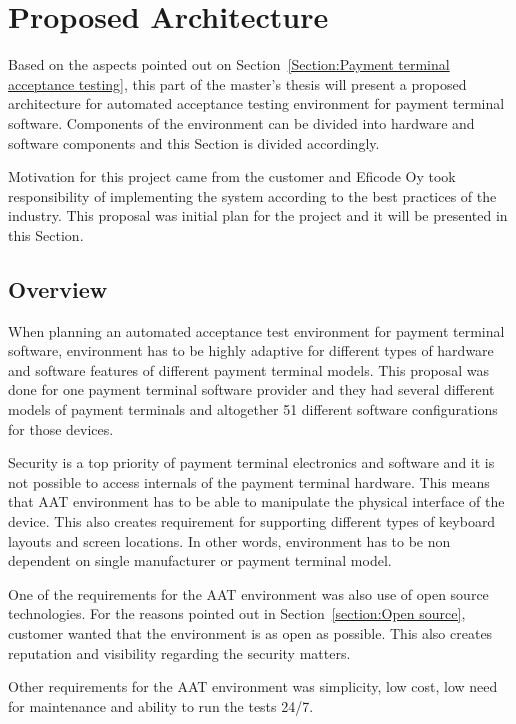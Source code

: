 
\chapter{Proposed Architecture}
\label{chapter:Proposed architecture}

Based on the aspects pointed out on Section~\ref{Section:Payment terminal acceptance testing}, this part of the master's thesis will present a proposed architecture for automated acceptance testing environment for payment terminal software. Components of the environment can be divided into hardware and software components and this Section is divided accordingly.

Motivation for this project came from the customer and Eficode Oy took responsibility of implementing the system according to the best practices of the industry. This proposal was initial plan for the project and it will be presented in this Section.

\section{Overview}

When planning an automated acceptance test environment for payment terminal software, environment has to be highly adaptive for different types of hardware and software features of different payment terminal models. This proposal was done for one payment terminal software provider and they had several different models of payment terminals and altogether 51 different software configurations for those devices.

Security is a top priority of payment terminal electronics and software and it is not possible to access internals of the payment terminal hardware. This means that AAT environment has to be able to manipulate the physical interface of the device. This also creates requirement for supporting different types of keyboard layouts and screen locations. In other words, environment has to be non dependent on single manufacturer or payment terminal model.

One of the requirements for the AAT environment was also use of open source technologies. For the reasons pointed out in Section~\ref{section:Open source}, customer wanted that the environment is as open as possible. This also creates reputation and visibility regarding the security matters.

Other requirements for the AAT environment was simplicity, low cost, low need for maintenance and ability to run the tests 24/7.

